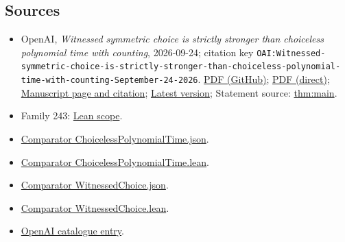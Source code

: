 \documentclass[11pt]{article}
\begin{document}
\subsection{Sources}
\begin{itemize}
\item OpenAI, \emph{Witnessed symmetric choice is strictly stronger than choiceless polynomial time with counting}, 2026-09-24; citation key \texttt{OAI:Witnessed-symmetric-choice-is-strictly-stronger-than-choiceless-polynomial-time-with-counting-September-24-2026}. \href{https://github.com/openai/math/blob/adc7f1241b42e322a6451854ab7e4b4c146bf78a/preprints/Witnessed-symmetric-choice-is-strictly-stronger-than-choiceless-polynomial-time-with-counting-September-24-2026/paper.pdf}{PDF (GitHub)}; \href{https://github.com/openai/math/raw/adc7f1241b42e322a6451854ab7e4b4c146bf78a/preprints/Witnessed-symmetric-choice-is-strictly-stronger-than-choiceless-polynomial-time-with-counting-September-24-2026/paper.pdf}{PDF (direct)}; \href{https://github.com/openai/math/blob/adc7f1241b42e322a6451854ab7e4b4c146bf78a/preprints/Witnessed-symmetric-choice-is-strictly-stronger-than-choiceless-polynomial-time-with-counting-September-24-2026/README.md}{Manuscript page and citation}; \href{https://github.com/openai/math/blob/main/preprints/Witnessed-symmetric-choice-is-strictly-stronger-than-choiceless-polynomial-time-with-counting-September-24-2026/paper.pdf}{Latest version}; Statement source: \href{https://github.com/openai/math/blob/adc7f1241b42e322a6451854ab7e4b4c146bf78a/preprints/Witnessed-symmetric-choice-is-strictly-stronger-than-choiceless-polynomial-time-with-counting-September-24-2026/build/sections/00-introduction.tex\#L38}{thm:main}.
\item Family 243: \href{https://github.com/openai/math/blob/adc7f1241b42e322a6451854ab7e4b4c146bf78a/lean/docs/243.md}{Lean scope}.
\item \href{https://github.com/openai/math/blob/adc7f1241b42e322a6451854ab7e4b4c146bf78a/lean/ComparatorChallenges/ChoicelessPolynomialTime.json}{Comparator ChoicelessPolynomialTime.json}.
\item \href{https://github.com/openai/math/blob/adc7f1241b42e322a6451854ab7e4b4c146bf78a/lean/ComparatorChallenges/ChoicelessPolynomialTime.lean}{Comparator ChoicelessPolynomialTime.lean}.
\item \href{https://github.com/openai/math/blob/adc7f1241b42e322a6451854ab7e4b4c146bf78a/lean/ComparatorChallenges/WitnessedChoice.json}{Comparator WitnessedChoice.json}.
\item \href{https://github.com/openai/math/blob/adc7f1241b42e322a6451854ab7e4b4c146bf78a/lean/ComparatorChallenges/WitnessedChoice.lean}{Comparator WitnessedChoice.lean}.
\item \href{https://github.com/openai/math/blob/adc7f1241b42e322a6451854ab7e4b4c146bf78a/CONTENTS.md}{OpenAI catalogue entry}.
\end{itemize}
\end{document}
